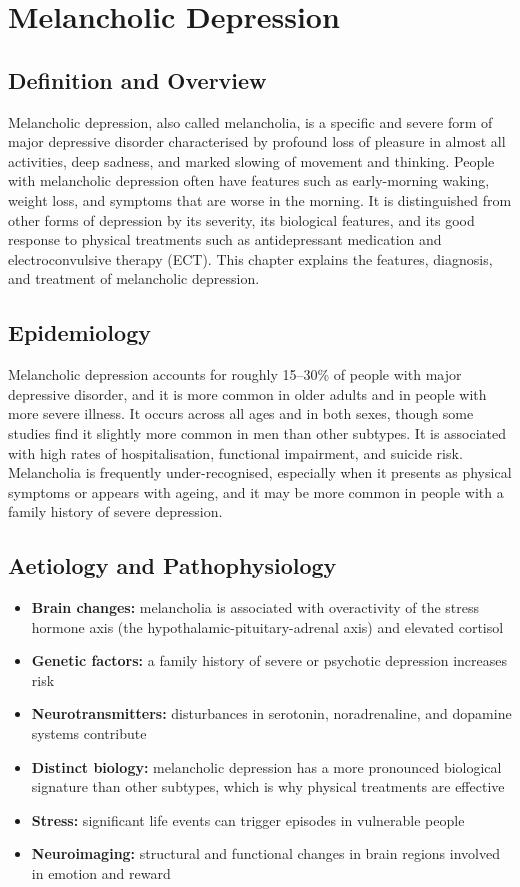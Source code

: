 \chapter{Melancholic Depression}

\section*{Definition and Overview}
Melancholic depression, also called melancholia, is a specific and severe form of major depressive disorder characterised by profound loss of pleasure in almost all activities, deep sadness, and marked slowing of movement and thinking. People with melancholic depression often have features such as early-morning waking, weight loss, and symptoms that are worse in the morning. It is distinguished from other forms of depression by its severity, its biological features, and its good response to physical treatments such as antidepressant medication and electroconvulsive therapy (ECT). This chapter explains the features, diagnosis, and treatment of melancholic depression.

\section*{Epidemiology}
Melancholic depression accounts for roughly 15--30\% of people with major depressive disorder, and it is more common in older adults and in people with more severe illness. It occurs across all ages and in both sexes, though some studies find it slightly more common in men than other subtypes. It is associated with high rates of hospitalisation, functional impairment, and suicide risk. Melancholia is frequently under-recognised, especially when it presents as physical symptoms or appears with ageing, and it may be more common in people with a family history of severe depression.

\section*{Aetiology and Pathophysiology}
\begin{itemize}
    \item \textbf{Brain changes:} melancholia is associated with overactivity of the stress hormone axis (the hypothalamic-pituitary-adrenal axis) and elevated cortisol
    \item \textbf{Genetic factors:} a family history of severe or psychotic depression increases risk
    \item \textbf{Neurotransmitters:} disturbances in serotonin, noradrenaline, and dopamine systems contribute
    \item \textbf{Distinct biology:} melancholic depression has a more pronounced biological signature than other subtypes, which is why physical treatments are effective
    \item \textbf{Stress:} significant life events can trigger episodes in vulnerable people
    \item \textbf{Neuroimaging:} structural and functional changes in brain regions involved in emotion and reward
\end{itemize}

